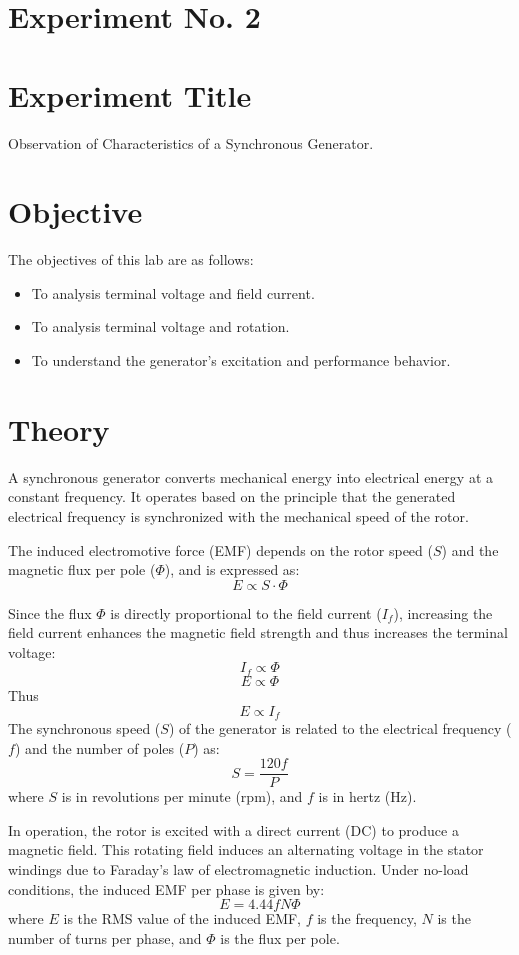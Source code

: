 \documentclass[a4paper,12pt]{article}
\begin{document}
	\section{Experiment No. 2}
	
	\section{Experiment Title }
Observation of Characteristics of a Synchronous Generator.
	
	\section{Objective}
	
	The objectives of this lab are as follows:
	\begin{itemize}
		\item To analysis terminal voltage and field current.
		\item To analysis terminal voltage and rotation.
		\item To understand the generator’s excitation and performance behavior.
		
			
	\end{itemize}
	
	\section{Theory}

	
	A synchronous generator converts mechanical energy into electrical energy at a constant frequency. It operates based on the principle that the generated electrical frequency is synchronized with the mechanical speed of the rotor.
	
	The induced electromotive force (EMF) depends on the rotor speed ($S$) and the magnetic flux per pole ($\Phi$), and is expressed as:
	\[
	E \propto S \cdot \Phi
	\]
	
	Since the flux $\Phi$ is directly proportional to the field current ($I_f$), increasing the field current enhances the magnetic field strength and thus increases the terminal voltage:
	\[
	I_f \propto \Phi
	\]
	\[
	E \propto \Phi
	\]
	Thus \[
	E \propto I_f
	\]
	The synchronous speed ($S$) of the generator is related to the electrical frequency ($f$) and the number of poles ($P$) as:
	\[
	S = \frac{120f}{P}
	\]
	where $S$ is in revolutions per minute (rpm), and $f$ is in hertz (Hz).
	
	In operation, the rotor is excited with a direct current (DC) to produce a magnetic field. This rotating field induces an alternating voltage in the stator windings due to Faraday's law of electromagnetic induction. Under no-load conditions, the induced EMF per phase is given by:
	\[
	E = 4.44 f N \Phi
	\]
	where $E$ is the RMS value of the induced EMF, $f$ is the frequency, $N$ is the number of turns per phase, and $\Phi$ is the flux per pole.
	
\end{document}
